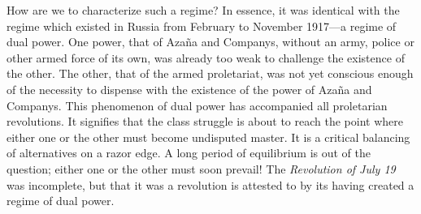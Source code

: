 How are we to characterize such a regime? In essence, it was identical with the regime which existed in Russia from February to November 1917---a regime of dual power. One power, that of Azaña and Companys, without an army, police or other armed force of its own, was already too weak to challenge the existence of the other. The other, that of the armed proletariat, was not yet conscious enough of the necessity to dispense with the existence of the power of Azaña and Companys. This phenomenon of dual power has accompanied all proletarian revolutions. It signifies that the class struggle is about to reach the point where either one or the other must become undisputed master. It is a critical balancing of alternatives on a razor edge. A long period of equilibrium is out of the question; either one or the other must soon prevail! The \emph{Revolution of July 19} was incomplete, but that it was a revolution is attested to by its having created a regime of dual power.